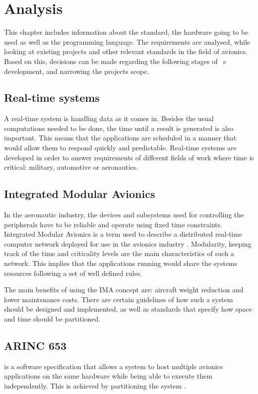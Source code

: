 
\chapter{Analysis}\label{chap:analysis}
This chapter includes information about 
the standard, the hardware going to be used as well as the programming
language.
The \arinc{} requirements are analysed, while looking at existing projects
and other relevant standards in the field of avionics. Based on this,
decisions can be made regarding the following stages of \OSname\ \textquotesingle s 
development, and narrowing the project\textquotesingle s
scope.

\section{Real-time systems}
A real-time system is handling data as it comes in.
Besides the usual computations needed to be done,
the time until a result is generated is also important.
This means that the applications are scheduled in a manner 
that would allow them to respond quickly and predictable.
Real-time systems are developed in order to answer 
requirements of different fields of work
where time is critical: military, automotive or aeronautics.

\section{Integrated Modular Avionics}
In the aeronautic industry, the devices and subsystems used for
controlling the peripherals have to be reliable and operate using
fixed time constraints. Integrated Modular Avionics is a term used
to describe a distributed real-time computer network deployed for
use in the avionics industry \cite{ima_description}.
Modularity, keeping track of the time and criticality levels are
the main characteristics of such a network.
This implies that the applications running would share the 
system\textquotesingle s resources following a set of well defined rules.

The main  benefits of using the IMA concept are: aircraft weight reduction
and lower maintenance costs\cite{arinc_scarlett}. 
There are certain guidelines of how such a system
should be designed and implemented, as well as standards that specify 
how space and time should be partitioned.

\section{ARINC 653}
\arinc{} is a software specification that allows a system to host 
multiple avionics applications on the same hardware while being able
to execute them independently. This is achieved by partitioning the
system \cite{arinc_page_2}.

